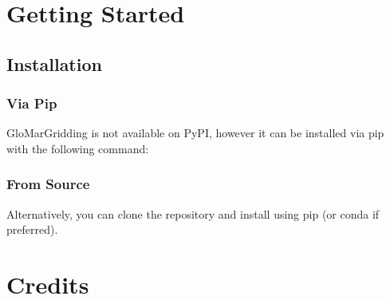 \documentclass[letterpaper,10pt,english]{sphinxmanual}
\begin{document}
\sphinxstepscope


\chapter{Getting Started}
\label{\detokenize{getting_started:getting-started}}\label{\detokenize{getting_started::doc}}

\section{Installation}
\label{\detokenize{getting_started:installation}}

\subsection{Via Pip}
\label{\detokenize{getting_started:via-pip}}
\sphinxAtStartPar
GloMarGridding is not available on PyPI, however it can be installed via pip with the following command:

\begin{sphinxVerbatim}[commandchars=\\\{\}]
\end{sphinxVerbatim}


\subsection{From Source}
\label{\detokenize{getting_started:from-source}}
\sphinxAtStartPar
Alternatively, you can clone the repository and install using pip (or conda if preferred).

\begin{sphinxVerbatim}[commandchars=\\\{\}]
\end{sphinxVerbatim}

\sphinxstepscope


\chapter{Credits}
\label{\detokenize{authors:credits}}\label{\detokenize{authors::doc}}
\end{document}
